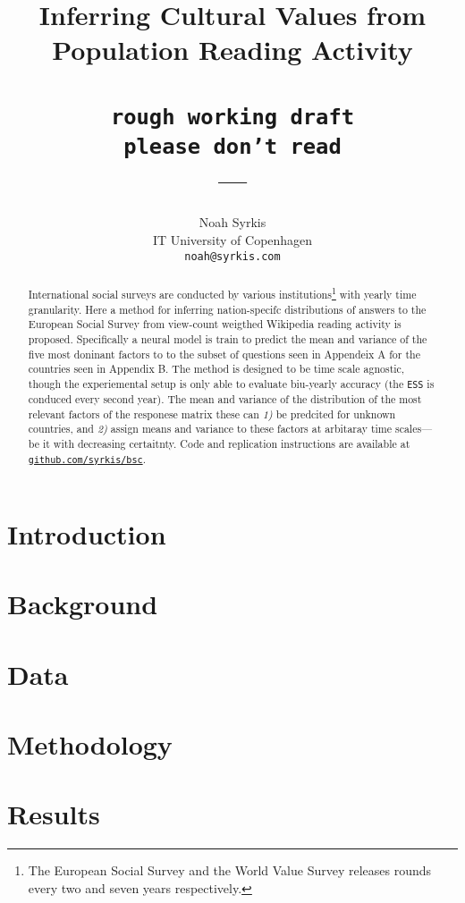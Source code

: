 \documentclass[11pt]{article}
\title{Inferring Cultural Values from Population Reading Activity\\ \texttt{\\rough working draft}\texttt{\\please don't read\\}—}
\author{Noah Syrkis \\
  IT University of Copenhagen \\
  \texttt{noah@syrkis.com} \\}
\begin{document}
\maketitle
\begin{abstract}
    International social surveys are conducted by various institutions\footnote{The European Social Survey and the World Value Survey releases rounds every two and seven years respectively.} with yearly time granularity.
    Here a method for inferring nation-specifc distributions of answers to the European Social Survey from view-count weigthed Wikipedia reading activity is proposed.
    Specifically a neural model is train to predict the mean and variance of the five most doninant factors to to the subset of questions seen in Appendeix A for the countries seen in Appendix B.
    The method is designed to be time scale agnostic, though the experiemental setup is only able to evaluate biu-yearly accuracy (the \texttt{ESS} is conduced every second year).
    The mean and variance of the distribution of the most relevant factors of the responese matrix these can \emph{1)} be predcited for unknown countries, and \emph{2)} assign means and variance to these factors at arbitaray time scales—be it with decreasing certaitnty.
    Code and replication instructions are available at \href{https://github.com/syrkis/bsc}{\texttt{github.com/syrkis/bsc}}.

\end{abstract}

\section{Introduction}


\section{Background}


\section{Data}


\section{Methodology}


\section{Results}

\end{document}
